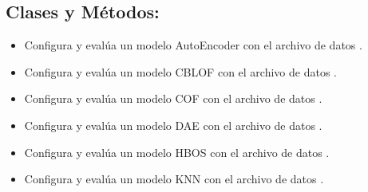 \documentclass[letterpaper,10pt,english]{sphinxmanual}
\begin{document}
\subsection{Clases y Métodos:}
\label{\detokenize{tutorial:clases-y-metodos}}\begin{itemize}
\item {} \begin{description}
\sphinxAtStartPar
Configura y evalúa un modelo AutoEncoder con el archivo de datos .

\end{description}

\item {} \begin{description}
\sphinxAtStartPar
Configura y evalúa un modelo CBLOF con el archivo de datos .

\end{description}

\item {} \begin{description}
\sphinxAtStartPar
Configura y evalúa un modelo COF con el archivo de datos .

\end{description}

\item {} \begin{description}
\sphinxAtStartPar
Configura y evalúa un modelo DAE con el archivo de datos .

\end{description}

\item {} \begin{description}
\sphinxAtStartPar
Configura y evalúa un modelo HBOS con el archivo de datos .

\end{description}

\item {} \begin{description}
\sphinxAtStartPar
Configura y evalúa un modelo KNN con el archivo de datos .


\end{description}
\end{itemize}
\end{document}

